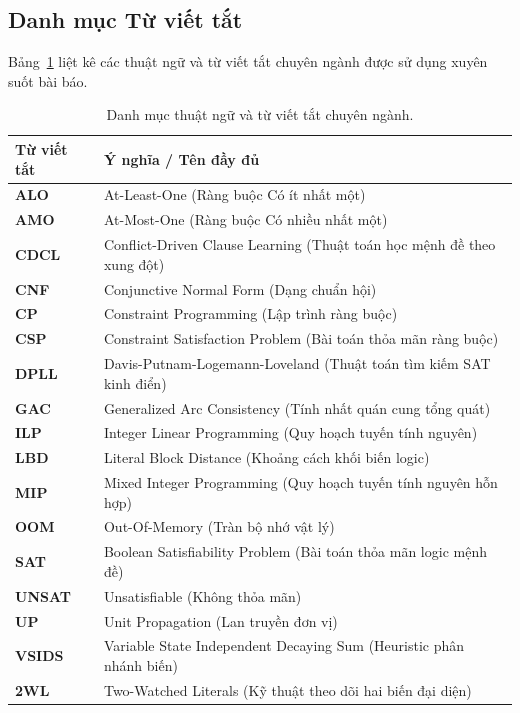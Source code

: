 \documentclass[a4paper,fleqn]{cas-sc}
\begin{document}
\subsection{Danh mục Từ viết tắt}
\label{subsec:abbreviations}
Bảng~\ref{tab:abbreviations} liệt kê các thuật ngữ và từ viết tắt chuyên ngành được sử dụng xuyên suốt bài báo.

\begin{table}[pos=htbp]
\centering
\caption{Danh mục thuật ngữ và từ viết tắt chuyên ngành.}
\label{tab:abbreviations}
\begin{tabular}{ll}
\toprule
\textbf{Từ viết tắt} & \textbf{Ý nghĩa / Tên đầy đủ} \\
\midrule
\textbf{ALO} & At-Least-One (Ràng buộc Có ít nhất một) \\
\textbf{AMO} & At-Most-One (Ràng buộc Có nhiều nhất một) \\
\textbf{CDCL} & Conflict-Driven Clause Learning (Thuật toán học mệnh đề theo xung đột) \\
\textbf{CNF} & Conjunctive Normal Form (Dạng chuẩn hội) \\
\textbf{CP} & Constraint Programming (Lập trình ràng buộc) \\
\textbf{CSP} & Constraint Satisfaction Problem (Bài toán thỏa mãn ràng buộc) \\
\textbf{DPLL} & Davis-Putnam-Logemann-Loveland (Thuật toán tìm kiếm SAT kinh điển) \\
\textbf{GAC} & Generalized Arc Consistency (Tính nhất quán cung tổng quát) \\
\textbf{ILP} & Integer Linear Programming (Quy hoạch tuyến tính nguyên) \\
\textbf{LBD} & Literal Block Distance (Khoảng cách khối biến logic) \\
\textbf{MIP} & Mixed Integer Programming (Quy hoạch tuyến tính nguyên hỗn hợp) \\
\textbf{OOM} & Out-Of-Memory (Tràn bộ nhớ vật lý) \\
\textbf{SAT} & Boolean Satisfiability Problem (Bài toán thỏa mãn logic mệnh đề) \\
\textbf{UNSAT} & Unsatisfiable (Không thỏa mãn) \\
\textbf{UP} & Unit Propagation (Lan truyền đơn vị) \\
\textbf{VSIDS} & Variable State Independent Decaying Sum (Heuristic phân nhánh biến) \\
\textbf{2WL} & Two-Watched Literals (Kỹ thuật theo dõi hai biến đại diện) \\
\bottomrule
\end{tabular}
\end{table}
\end{document}
